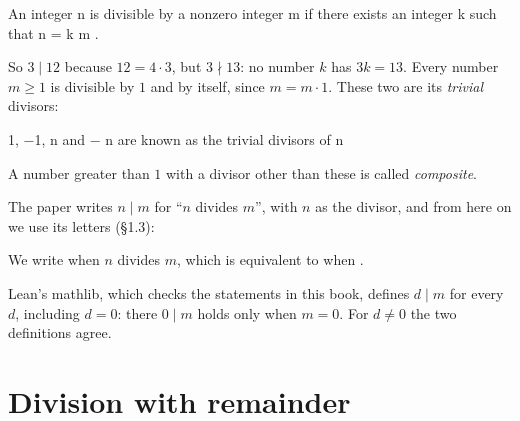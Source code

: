 \bpush\begin{bquote}

An integer n is divisible
by a nonzero integer m if there exists an integer k such that n = k m .

\end{bquote}\bpop

So \(3 \mid 12\) because \(12 = 4 \cdot 3\), but \(3 \nmid 13\): no
number \(k\) has \(3k = 13\). Every number \(m \geq 1\) is divisible by
\(1\) and by itself, since \(m = m \cdot 1\). These two are its
\emph{trivial} divisors:

\bpush\begin{bquote}

1, −1, n and − n are
known as the trivial divisors of n

\end{bquote}\bpop

A number greater than
\(1\) with a divisor other than these is called \emph{composite}.

\bpush\begin{bremark}

The paper writes \(n \mid m\) for ``\(n\) divides \(m\)'', with \(n\) as
the divisor, and from here on we use its letters (§1.3):

\bpush\begin{bquote}

We write
when \(n\) divides \(m\), which is equivalent to
when
.

\end{bquote}\bpop

Lean's mathlib, which checks the statements in this book, defines
\(d \mid m\) for every \(d\), including \(d = 0\): there \(0 \mid m\)
holds only when \(m = 0\). For \(d \ne 0\) the two definitions agree.

\end{bremark}\bpop

\hypertarget{division-with-remainder}{%
\section{Division with remainder}\label{division-with-remainder}}

